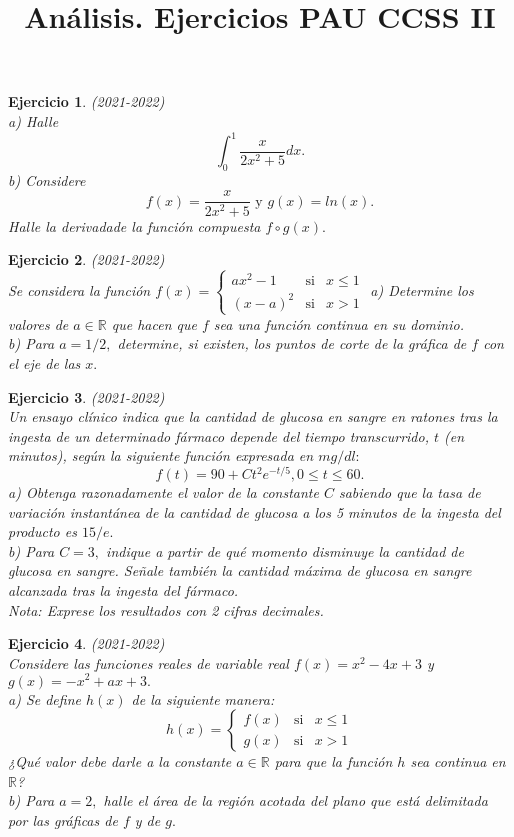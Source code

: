 \documentclass[12pt, a4paper]{amsart}
\newtheorem{ejer}{Ejercicio}
\begin{document}
\thispagestyle{plain}

\title{Análisis. Ejercicios PAU CCSS II}

\date{}

\maketitle

\begin{ejer}\em (2021-2022)\\
a) Halle
\[\int_0^1 \frac{x}{2x^2+5}dx.\]
b) Considere
\[f(x)=\frac{x}{2x^2+5} \text{ y } g(x) = ln(x).\]
Halle la derivadade la función compuesta $f\circ g(x).$
\end{ejer}

\begin{ejer}\em (2021-2022)\\
Se considera la función $f(x)=\left \{ \begin{matrix}
ax^2 -1  & \text{si} & x \leq 1\\
(x-a)^2 & \text{si} & x> 1
\end{matrix}\right.
$
a) Determine los valores de $a\in\mathbb{R}$ que hacen que $f$ sea una función continua en su dominio.\\
b) Para $a = 1/2,$ determine, si existen, los puntos de corte de la gráfica de $f$ con el eje de las $x.$
\end{ejer}

\begin{ejer}\em (2021-2022)\\
Un ensayo clínico indica que la cantidad de glucosa en sangre en ratones tras la ingesta de un determinado fármaco depende del tiempo transcurrido, $t$ (en minutos), según la siguiente función
expresada en $mg/dl:$
\[f(t) = 90 + Ct^2e^{-t/5}, 0 \leq t \leq 60.\]
a) Obtenga razonadamente el valor de la constante $C$ sabiendo que la tasa de variación instantánea de la cantidad de glucosa a los 5 minutos de la ingesta del producto es $15/e.$\\
b) Para $C = 3,$ indique a partir de qué momento disminuye la cantidad de glucosa en sangre. Señale también la cantidad máxima de glucosa en sangre alcanzada tras la ingesta del fármaco.\\
Nota: Exprese los resultados con 2 cifras decimales.
\end{ejer}

\begin{ejer}\em (2021-2022)\\
Considere las funciones reales de variable real $f(x) = x^2 - 4x + 3$ y $g(x) = -x^2 + ax + 3.$\\
a) Se define $h(x)$ de la siguiente manera:
\[h(x)=\left \{ \begin{matrix}
f(x)  & \text{si} & x \leq 1\\
g(x) & \text{si} & x> 1
\end{matrix}\right.\]
¿Qué valor debe darle a la constante $a\in\mathbb{R}$ para que la función $h$ sea continua en $\mathbb{R}$?\\
b) Para $a = 2,$ halle el área de la región acotada del plano que está delimitada por las gráficas de $f$ y de $g.$
\end{ejer}
\end{document}
